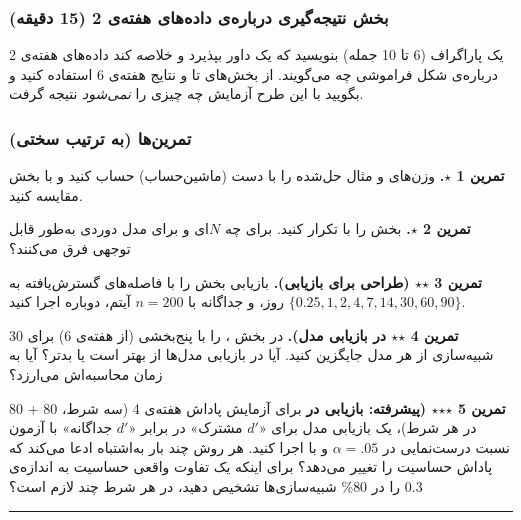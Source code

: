 \subsubsection{\texorpdfstring{بخش  نتیجه‌گیری درباره‌ی داده‌های
هفته‌ی 2 (15
دقیقه)}{بخش E: نتیجه‌گیری درباره‌ی داده‌های هفته‌ی 2 (15 دقیقه)}}

یک پاراگراف (6 تا 10 جمله) بنویسید که یک داور بپذیرد و خلاصه کند داده‌های
هفته‌ی 2 درباره‌ی شکل فراموشی چه می‌گویند. از بخش‌های  تا  و
نتایج  هفته‌ی 6 استفاده کنید و بگویید با این طرح آزمایش چه چیزی را
\emph{نمی‌شود} نتیجه گرفت.

\subsubsection{تمرین‌ها (به ترتیب سختی)}

\textbf{تمرین 1 \ensuremath{\star}.} وزن‌های  و  مثال حل‌شده را با دست
(ماشین‌حساب) حساب کنید و با بخش  مقایسه کنید.

\textbf{تمرین 2 \ensuremath{\star}.} بخش  را با  تکرار کنید. برای چه
\(N\)ای  و  برای مدل دوردی به‌طور قابل توجهی فرق می‌کنند؟

\textbf{تمرین 3 \ensuremath{\star}\ensuremath{\star} (طراحی برای بازیابی).} بازیابی  بخش
 را با فاصله‌های گسترش‌یافته به
\(\{0.25,\allowbreak 1,\allowbreak 2,\allowbreak 4,\allowbreak 7,\allowbreak 14,\allowbreak 30,\allowbreak 60,\allowbreak 90\}\) روز، و جداگانه با \(n = 200\)
آیتم، دوباره اجرا کنید.

\textbf{تمرین 4 \ensuremath{\star}\ensuremath{\star}  در بازیابی مدل).} در بخش ،
 را با  پنج‌بخشی (از هفته‌ی 6) برای 30 شبیه‌سازی از هر
مدل جایگزین کنید. آیا  در بازیابی مدل‌ها از  بهتر است یا
بدتر؟ آیا به زمان محاسبه‌اش می‌ارزد؟

\textbf{تمرین 5 \ensuremath{\star}\ensuremath{\star}\ensuremath{\star} (پیشرفته: بازیابی در } برای آزمایش پاداش
هفته‌ی 4 (سه شرط، 80 + 80  در هر شرط)، یک بازیابی مدل برای
«\(d'\) مشترک» در برابر «\(d'\) جداگانه» با آزمون نسبت درست‌نمایی در
\(\alpha = .05\) و با  اجرا کنید. هر روش چند بار به‌اشتباه ادعا
می‌کند که پاداش حساسیت را تغییر می‌دهد؟ برای اینکه یک تفاوت واقعی حساسیت
به اندازه‌ی 0.3 را در 80\% شبیه‌سازی‌ها تشخیص دهید، در هر شرط چند
 لازم است؟

\begin{center}\rule{0.5\linewidth}{0.5pt}\end{center}

